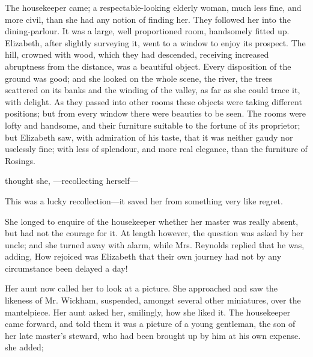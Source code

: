 The housekeeper came; a respectable-looking elderly woman, much less fine, and more civil, than she had any notion of finding her. They followed her into the dining-parlour. It was a large, well proportioned room, handsomely fitted up. Elizabeth, after slightly surveying it, went to a window to enjoy its prospect. The hill, crowned with wood, which they had descended, receiving increased abruptness from the distance, was a beautiful object. Every disposition of the ground was good; and she looked on the whole scene, the river, the trees scattered on its banks and the winding of the valley, as far as she could trace it, with delight. As they passed into other rooms these objects were taking different positions; but from every window there were beauties to be seen. The rooms were lofty and handsome, and their furniture suitable to the fortune of its proprietor; but Elizabeth saw, with admiration of his taste, that it was neither gaudy nor uselessly fine; with less of splendour, and more real elegance, than the furniture of Rosings.

 thought she, ---recollecting herself---

This was a lucky recollection---it saved her from something very like regret.

She longed to enquire of the housekeeper whether her master was really absent, but had not the courage for it. At length however, the question was asked by her uncle; and she turned away with alarm, while Mrs. Reynolds replied that he was, adding,  How rejoiced was Elizabeth that their own journey had not by any circumstance been delayed a day!

Her aunt now called her to look at a picture. She approached and saw the likeness of Mr. Wickham, suspended, amongst several other miniatures, over the mantelpiece. Her aunt asked her, smilingly, how she liked it. The housekeeper came forward, and told them it was a picture of a young gentleman, the son of her late master's steward, who had been brought up by him at his own expense.  she added; 

